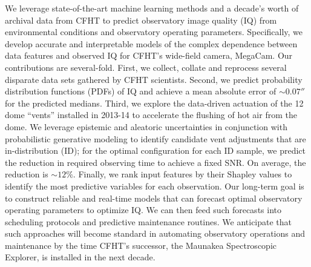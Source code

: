 We leverage state-of-the-art machine learning methods and a decade's worth of archival data from CFHT to predict observatory image quality (IQ) from environmental conditions and observatory operating parameters. Specifically, we develop accurate and interpretable models of the complex dependence between data features and observed IQ for CFHT's wide-field camera, MegaCam. Our contributions are several-fold. First, we collect, collate and reprocess several disparate data sets gathered by CFHT scientists. Second, we predict probability distribution functions (PDFs) of IQ and achieve a mean absolute error of $\sim0.07''$ for the predicted medians. Third, we explore the data-driven actuation of the 12 dome ``vents'' installed in 2013-14 to accelerate the flushing of hot air from the dome. We leverage epistemic and aleatoric uncertainties in conjunction with probabilistic generative modeling to identify candidate vent adjustments that are in-distribution (ID); for the optimal configuration for each ID sample, we predict the reduction in required observing time to achieve a fixed SNR.  On average, the reduction is $\sim12\%$. Finally, we rank input features by their Shapley values to identify the most predictive variables for each observation. Our long-term goal is to construct reliable and real-time models that can forecast optimal observatory operating parameters to optimize IQ. We can then feed such forecasts into scheduling protocols and predictive maintenance routines. We anticipate that such approaches will become standard in automating observatory operations and maintenance by the time CFHT's successor, the Maunakea Spectroscopic Explorer, is installed in the next decade.


